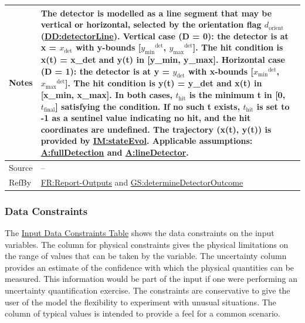 \documentclass[12pt]{article}
\begin{document}
\begin{minipage}{\textwidth}
\begin{tabular}{>{\raggedright}p{}>{\raggedright\arraybackslash}p{}}
Notes & The detector is modelled as a line segment that may be vertical or horizontal, selected by the orientation flag ${d_{\text{orient}}}$ (\hyperref[DD:detectorLine]{DD:detectorLine}). Vertical case (D = 0): the detector is at x = ${x_{\text{det}}}$ with y-bounds [${{y_{\text{min}}}^{\text{det}}}$, ${{y_{\text{max}}}^{\text{det}}}$]. The hit condition is x(t) = x\_det and y(t) in [y\_min, y\_max]. Horizontal case (D = 1): the detector is at y = ${y_{\text{det}}}$ with x-bounds [${{x_{\text{min}}}^{\text{det}}}$, ${{x_{\text{max}}}^{\text{det}}}$]. The hit condition is y(t) = y\_det and x(t) in [x\_min, x\_max]. In both cases, ${t_{\text{hit}}}$ is the minimum t in [0, ${t_{\text{final}}}$] satisfying the condition. If no such t exists, ${t_{\text{hit}}}$ is set to -1 as a sentinel value indicating no hit, and the hit coordinates are undefined. The trajectory (x(t), y(t)) is provided by \hyperref[IM:stateEvol]{IM:stateEvol}. Applicable assumptions: \hyperref[fullDetection]{A:fullDetection} and \hyperref[lineDetector]{A:lineDetector}.
        
\\ \midrule
Source & --
         
\\ \midrule
RefBy & \hyperref[reportOutputs]{FR:Report-Outputs} and \hyperref[determineDetectorOutcome]{GS:determineDetectorOutcome}
        
\\ \bottomrule
\end{tabular}
\end{minipage}

\subsubsection{Data Constraints}
\label{Sec:DataConstraints}
The \hyperref[Table:InDataConstraints]{Input Data Constraints Table} shows the data constraints on the input variables. The column for physical constraints gives the physical limitations on the range of values that can be taken by the variable. The uncertainty column provides an estimate of the confidence with which the physical quantities can be measured. This information would be part of the input if one were performing an uncertainty quantification exercise. The constraints are conservative to give the user of the model the flexibility to experiment with unusual situations. The column of typical values is intended to provide a feel for a common scenario.
\end{document}
